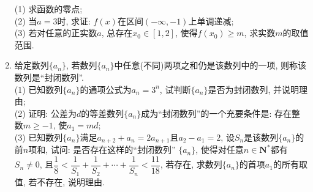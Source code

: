 \documentclass[10pt,a4paper]{article}
\begin{document}
\begin{enumerate}[1.]
(1) 求函数的零点;\\
(2) 当$a=3$时, 求证: $f(x)$在区间$(-\infty ,-1)$上单调递减;\\
(3) 若对任意的正实数$a$, 总存在$x_0\in [1,2]$, 使得$f(x_0)\ge m$, 求实数$m$的取值范围.
\item 给定数列$\{a_n\}$, 若数列$\{a_n\}$中任意(不同)两项之和仍是该数列中的一项, 则称该数列是``封闭数列''.\\
(1) 已知数列$\{a_n\}$的通项公式为$a_n=3^n$, 试判断$\{a_n\}$是否为封闭数列, 并说明理由;\\
(2) 证明: 公差为$d$的等差数列$\{a_n\}$成为``封闭数列''的一个充要条件是: 存在整数$m\ge -1$, 使$a_1=md$;\\
(3) 已知数列$\{a_n\}$满足$a_{n+2}+a_n=2a_{n+1}$且$a_2-a_1=2$, 设$S_n$是该数列$\{a_n\}$的前$n$项和, 试问: 是否存在这样的``封闭数列'' $\{a_n\}$, 使得对任意$n\in \mathbf{N}^*$都有$S_n\ne 0$, 且$\dfrac 18<\dfrac 1{S_1}+\dfrac 1{S_2}+\cdots +\dfrac 1{S_n}<\dfrac{11}{18}$, 若存在, 求数列$\{a_n\}$的首项$a_1$的所有取值, 若不存在, 说明理由.


\end{enumerate}
\end{document}
